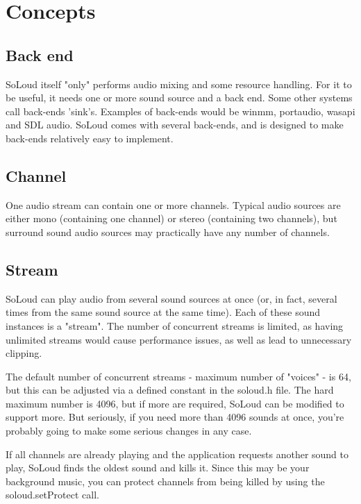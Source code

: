 
\chapter{Concepts}

\section{Back end}

SoLoud itself "only" performs audio mixing and some resource handling. For it to be useful, it needs one or more sound source and a back end. Some other systems call back-ends 'sink's. Examples of back-ends would be winmm, portaudio, wasapi and SDL audio. SoLoud comes with several back-ends, and is designed to make back-ends relatively easy to implement.

\section{Channel}

One audio stream can contain one or more channels. Typical audio sources are either mono (containing one channel) or stereo (containing two channels), but surround sound audio sources may practically have any number of channels.

\section{Stream}

SoLoud can play audio from several sound sources at once (or, in fact, several times from the same sound source at the same time). Each of these sound instances is a "stream". The number of concurrent streams is limited, as having unlimited streams would cause performance issues, as well as lead to unnecessary clipping.

The default number of concurrent streams - maximum number of "voices" - is 64, but this can be adjusted via a defined constant in the soloud.h file. The hard maximum number is 4096, but if more are required, SoLoud can be modified to support more. But seriously, if you need more than 4096 sounds at once, you're probably going to make some serious changes in any case.

If all channels are already playing and the application requests another sound to play, SoLoud finds the oldest sound and kills it. Since this may be your background music, you can protect channels from being killed by using the soloud.setProtect call.


